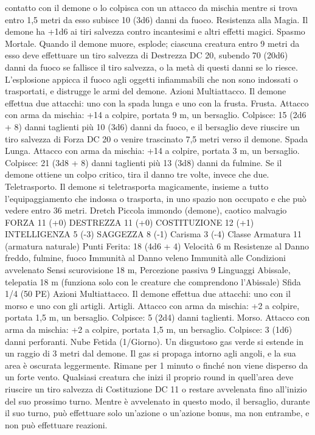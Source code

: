 \begin{multicols}{2}
contatto con il demone o lo colpisca con un attacco da mischia
mentre si trova entro 1,5 metri da esso subisce 10 (3d6) danni da
fuoco.
Resistenza alla Magia. Il demone ha +1d6 ai tiri salvezza
contro incantesimi e altri effetti magici.
Spasmo Mortale. Quando il demone muore, esplode; ciascuna
creatura entro 9 metri da esso deve effettuare un tiro salvezza di
Destrezza DC 20, subendo 70 (20d6) danni da fuoco se fallisce il
tiro salvezza, o la metà di questi danni se lo riesce. L’esplosione
appicca il fuoco agli oggetti infiammabili che non sono indossati
o trasportati, e distrugge le armi del demone.
Azioni
Multiattacco. Il demone effettua due attacchi: uno con la spada
lunga e uno con la frusta.
Frusta. Attacco con arma da mischia: +14 a colpire, portata 9 m,
un bersaglio.
Colpisce: 15 (2d6 + 8) danni taglienti più 10 (3d6) danni da
fuoco, e il bersaglio deve riuscire un tiro salvezza di Forza DC
20 o venire trascinato 7,5 metri verso il demone.
Spada Lunga. Attacco con arma da mischia: +14 a colpire,
portata 3 m, un bersaglio.
Colpisce: 21 (3d8 + 8) danni taglienti più 13 (3d8) danni da
fulmine. Se il demone ottiene un colpo critico, tira il danno tre
volte, invece che due.
Teletrasporto. Il demone si teletrasporta magicamente, insieme a
tutto l’equipaggiamento che indossa o trasporta, in uno spazio
non occupato e che può vedere entro 36 metri.
Dretch
Piccola immondo (demone), caotico malvagio
FORZA 11 (+0)
DESTREZZA 11 (+0)
COSTITUZIONE 12 (+1)
INTELLIGENZA 5 (-3)
SAGGEZZA 8 (-1)
Carisma 3 (-4)
Classe Armatura 11 (armatura naturale)
\hspace*{0pt}\hfill{Punti Ferita}: 18 (4d6 + 4)
Velocità 6 m
Resistenze al Danno freddo, fulmine, fuoco
Immunità al Danno veleno
Immunità alle Condizioni avvelenato
Sensi scurovisione 18 m, Percezione passiva 9
Linguaggi Abissale, telepatia 18 m (funziona solo con le
creature che comprendono l’Abissale)
Sfida 1/4 (50 PE)
Azioni
Multiattacco. Il demone effettua due attacchi: uno con il morso e
uno con gli artigli.
Artigli. Attacco con arma da mischia: +2 a colpire, portata 1,5
m, un bersaglio.
Colpisce: 5 (2d4) danni taglienti.
Morso. Attacco con arma da mischia: +2 a colpire, portata 1,5
m, un bersaglio.
Colpisce: 3 (1d6) danni perforanti.
Nube Fetida (1/Giorno). Un disgustoso gas verde si estende in
un raggio di 3 metri dal demone. Il gas si propaga intorno agli
angoli, e la sua area è oscurata leggermente. Rimane per 1
minuto o finché non viene disperso da un forte vento. Qualsiasi
creatura che inizi il proprio round in quell’area deve riuscire un
tiro salvezza di Costituzione DC 11 o restare avvelenata fino
all’inizio del suo prossimo turno. Mentre è avvelenato in questo
modo, il bersaglio, durante il suo turno, può effettuare solo
un’azione o un’azione bonus, ma non entrambe, e non può
effettuare reazioni. 
 

\end{multicols}
